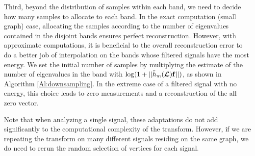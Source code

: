 \documentclass[journal, 10pt]{IEEEtran}
\begin{document}
Third, beyond the distribution of samples within each band, we need to decide how many samples to allocate to each band. In the exact computation (small graph) case, allocating the samples according to the number of eigenvalues contained in the disjoint bands ensures perfect reconstruction. However, with approximate computations, it is beneficial to the overall reconstruction error to do a better job of interpolation on the bands whose filtered signals have the most energy. %
We set the initial number of samples by multiplying the estimate of the number of eigenvalues in the band with $\log(1+||\tilde{h}_m(\boldsymbol{\mathcal{L}}){\bf f}||)$, as shown in Algorithm \ref{Al:downsampling}. In the extreme case of a filtered signal with no energy, this choice leads to zero measurements and a reconstruction of the all zero vector.






Note that when analyzing a single signal, these adaptations do not add significantly to the computational complexity of the transform. However, if we are repeating the transform on many different signals residing on the same graph, we do need to rerun the random selection of vertices for each signal.
\end{document}
